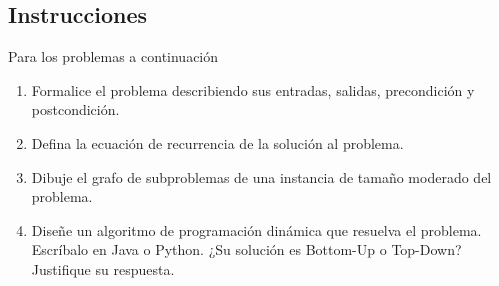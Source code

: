\subsection*{Instrucciones}
Para los problemas a continuación
\begin{enumerate}
	\item Formalice el problema describiendo sus entradas, salidas, precondición y postcondición.
	\item Defina la ecuación de recurrencia de la solución al problema.
	\item Dibuje el grafo de subproblemas de una instancia de tamaño moderado del problema.
	\item Diseñe un algoritmo de programación dinámica que resuelva el problema.
		Escríbalo en Java o Python. ¿Su solución es Bottom-Up o Top-Down? Justifique
		su respuesta.
\end{enumerate}

